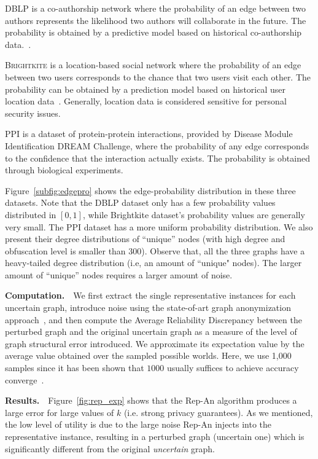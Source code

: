 \textsc{DBLP} is a co-authorship network where the probability of an edge between two authors represents the likelihood two authors will collaborate in the future. The probability is obtained by a predictive model based on historical co-authorship data.~\cite{Jin_Distance_2011}. 

\textsc{Brightkite} is a location-based social network where the probability of an edge between two users corresponds to the chance that two users visit each other. The probability can be obtained by a prediction model based on historical user location data~\cite{Cho_Friendship_2011}. Generally, location data is considered sensitive for personal security issues. 

\textsc{PPI} is a dataset of protein-protein interactions, provided by Disease Module Identification DREAM Challenge, where the probability of any edge corresponds to the confidence that the interaction actually exists.
The probability is obtained through biological experiments.

Figure~\ref{subfig:edgepro} shows the edge-probability distribution in these three datasets. 
Note that the DBLP dataset only has a few probability values distributed in $[0,1]$, while Brightkite dataset's probability values are generally very small. The PPI dataset has a more uniform probability distribution. 
We also present their degree distributions of ``unique'' nodes (with high degree and obfuscation level is smaller than $300$). Observe that, all the three graphs have a heavy-tailed degree distribution (i.e, an amount of ``unique" nodes). The larger amount of ``unique'' nodes requires a larger amount of noise.


\textbf{Computation.}~~We first extract the single representative instances for each uncertain graph, introduce noise using the state-of-art graph anonymization approach~\cite{Boldi_Injecting_2012}, and then compute the Average Reliability Discrepancy between the perturbed graph and the original uncertain graph as a measure of the level of graph structural error introduced. We approximate its expectation value by the average value obtained over the sampled possible worlds. Here, we use 1,000 samples since it has been shown that $1000$ usually suffices to achieve accuracy converge~\cite{Potamias_K_2010}.

\textbf{Results.}~~Figure~\ref{fig:rep_exp} shows that the Rep-An algorithm produces a large error for large values of $k$ (i.e. strong privacy guarantees). As we mentioned, the low level of utility is due to the large noise Rep-An injects into the representative instance, resulting in a perturbed graph (uncertain one) which is significantly different from the original \emph{uncertain} graph. 

